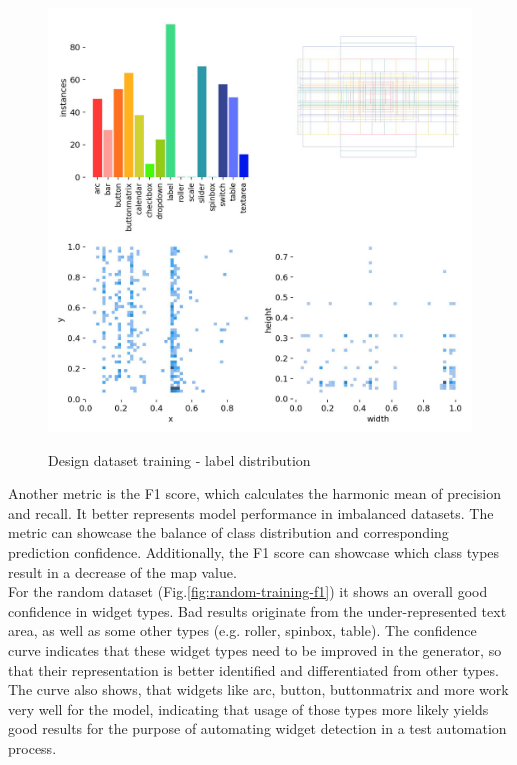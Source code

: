 \documentclass[Bachelor, BIC, english, fhCitStyle, IEEE]{BASE/twbook} %
\begin{document}
\begin{figure}[H]
    \caption{Design dataset training - label distribution}
    \centering
    \includegraphics[width=\textwidth]{PICs/train373/labels.jpg}
    \label{fig:design-training-labels}
\end{figure}
\noindent
Another metric is the F1 score, which calculates the harmonic mean of precision and recall. It better represents model performance in imbalanced datasets. The metric can showcase the balance of class distribution and corresponding prediction confidence. Additionally, the F1 score can showcase which class types result in a decrease of the \ac{map} value.\\
For the random dataset (Fig.\ref{fig:random-training-f1}) it shows an overall good confidence in widget types. Bad results originate from the under-represented text area, as well as some other types (e.g. roller, spinbox, table). The confidence curve indicates that these widget types need to be improved in the generator, so that their representation is better identified and differentiated from other types. The curve also shows, that widgets like arc, button, buttonmatrix and more work very well for the model, indicating that usage of those types more likely yields good results for the purpose of automating widget detection in a test automation process.
\end{document}
